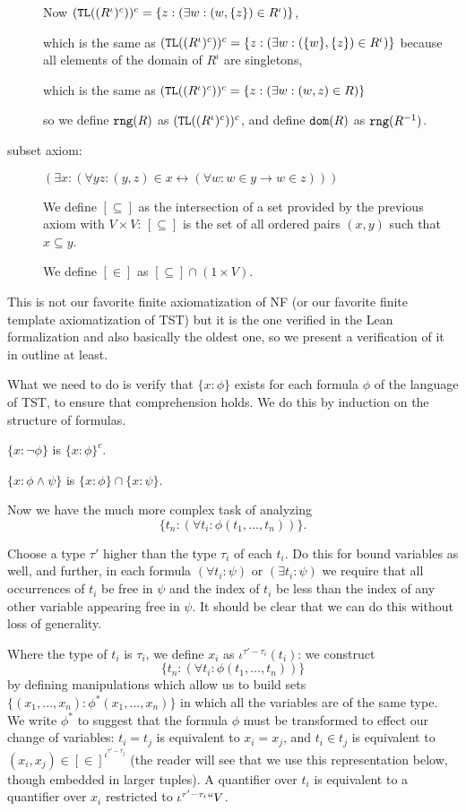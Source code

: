 \documentclass{article}
\theoremstyle{definition}
\theoremstyle{remark}
\begin{document}
\begin{description}
Now $({\tt TL}((R^\iota)^c))^c = \{z:(\exists w:(w,\{z\})\in R^\iota)\}$,

which is the same as $({\tt TL}((R^\iota)^c))^c = \{z:(\exists w:(\{w\},\{z\})\in R^\iota)\}$ because all elements
of the domain of $R^{\iota}$ are singletons,

which is the same as $({\tt TL}((R^\iota)^c))^c = \{z:(\exists w:(w,z)\in R)\}$

so we define ${\tt rng}(R)$ as $({\tt TL}((R^\iota)^c))^c$,
and define ${\tt dom}(R)$ as ${\tt rng}(R^{-1})$.

\item[subset axiom:]  $(\exists x:(\forall yz:(y,z) \in x \leftrightarrow (\forall w:w \in y \rightarrow w \in z)))$

We define $[\subseteq]$ as the intersection of a set provided by the previous axiom with $V \times V$:  $[\subseteq]$ is the set of all ordered pairs $(x,y)$ such that $x \subseteq y$.

We define $[\in]$ as $[\subseteq]\cap (1 \times V)$.



\end{description}

This is not our favorite finite axiomatization of NF (or our favorite finite template axiomatization of TST) but it is the one verified in the Lean formalization and also basically the oldest one, so we present a verification of it in outline at least.

What we need to do is verify that $\{x:\phi\}$ exists for each formula $\phi$ of the language of TST, to ensure that comprehension holds.  We do this by induction on the structure of formulas.

$\{x:\neg \phi\}$ is $\{x :\phi\}^c$.

$\{x :\phi \wedge \psi\}$ is $\{x:\phi \} \cap \{x:\psi\}$.

Now we have the much more complex task of analyzing $$\{t_{n}:(\forall t_i:\phi(t_1,\ldots,t_n))\}.$$

Choose a type $\tau'$ higher than the type $\tau_i$ of each $t_i$.  Do this for bound variables
as well, and further, in each formula $(\forall t_i:\psi)$ or $(\exists t_i:\psi)$ we require that all occurrences of $t_i$ be free in $\psi$ and the index of $t_i$ be less than the index
of any other variable appearing free in $\psi$.  It should be clear that we can do this without loss of generality.

Where the type of $t_i$ is $\tau_i$, we define $x_i$ as $\iota^{\tau'-\tau_i}(t_i)$:  we construct $$\{t_{n}:(\forall t_i:\phi(t_1,\ldots,t_n))\}$$ by defining manipulations which allow us to build sets $\{(x_1,\ldots,x_n):\phi^*(x_1,\ldots,x_n)\}$ in which
all the variables are of the same type.  We write $\phi^*$ to suggest that the formula $\phi$ must be transformed to effect our change of variables:  $t_i = t_j$ is equivalent to $x_i = x_j$, and $t_i \in t_j$ is equivalent to $(x_i,x_j) \in [\in]^{\iota^{\tau'-\tau_j}}$  (the reader will see that we use this representation below, though embedded in larger tuples).  A quantifier over $t_i$ is equivalent to a quantifier over $x_i$ restricted to $\iota^{\tau'-\tau_i}``V$.
\end{document}
